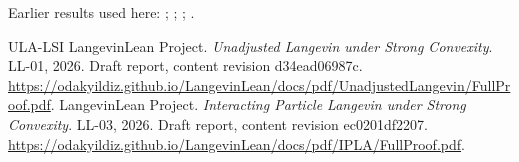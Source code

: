 \documentclass[11pt,a4paper]{article}
\begin{document}
Earlier results used here: \cite[Section~3.17.3]{LangevinLean2026ULASC}; \cite[Section~3.17.4]{LangevinLean2026ULASC}; \cite[Section~3.26.3]{LangevinLean2026ULASC}; \cite[Section~3.36.7]{LangevinLean2026ULASC}.

\begin{thebibliography}{ULA-LSI}
LangevinLean Project. \emph{Unadjusted Langevin under Strong Convexity}. LL-01, 2026. Draft report, content revision d34ead06987c. \url{https://odakyildiz.github.io/LangevinLean/docs/pdf/UnadjustedLangevin/FullProof.pdf}.
LangevinLean Project. \emph{Interacting Particle Langevin under Strong Convexity}. LL-03, 2026. Draft report, content revision ec0201df2207. \url{https://odakyildiz.github.io/LangevinLean/docs/pdf/IPLA/FullProof.pdf}.
\end{thebibliography}
\end{document}

